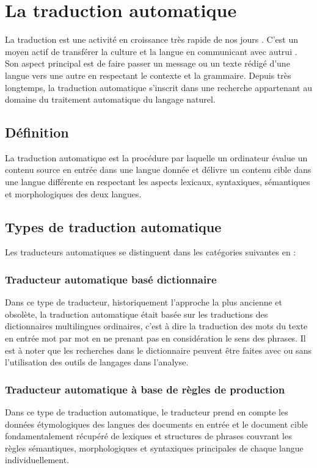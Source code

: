 \section{La traduction automatique}
La traduction est une activité en croissance très rapide de nos jours \cite{tradstat}. C'est un moyen actif de transférer la culture et la langue en communicant avec autrui \cite{tradcom}. Son aspect principal est de faire passer un message ou un texte rédigé d'une langue vers une autre en respectant le contexte et la grammaire. Depuis très longtemps, la traduction automatique s'inscrit dans une recherche appartenant au domaine du traitement automatique du langage naturel.
    \subsection{Définition}
    La traduction automatique est la procédure par laquelle un ordinateur évalue un contenu source en entrée dans une langue donnée et délivre un contenu cible dans une langue différente en respectant les aspects lexicaux, syntaxiques, sémantiques et morphologiques des deux langues.
    \subsection{Types de traduction automatique}
    Les traducteurs automatiques se distinguent dans les catégories suivantes en :
        \subsubsection{Traducteur automatique basé dictionnaire}
        Dans ce type de traducteur, historiquement l'approche la plus ancienne et obsolète, la traduction automatique était basée sur les traductions des dictionnaires multilingues ordinaires, c'est à dire la traduction des mots du texte en entrée mot par mot en ne prenant pas en considération le sens des phrases. Il est à noter que les recherches dans le dictionnaire peuvent être faites avec ou sans l'utilisation des outils de langages dans l'analyse.
        \subsubsection{Traducteur automatique à base de règles de production}
        Dans ce type de traduction automatique, le traducteur prend en compte les données étymologiques des langues des documents en entrée et le document cible fondamentalement récupéré de 
        lexiques et structures de phrases couvrant les règles sémantiques, morphologiques et syntaxiques principales de chaque langue individuellement. 

